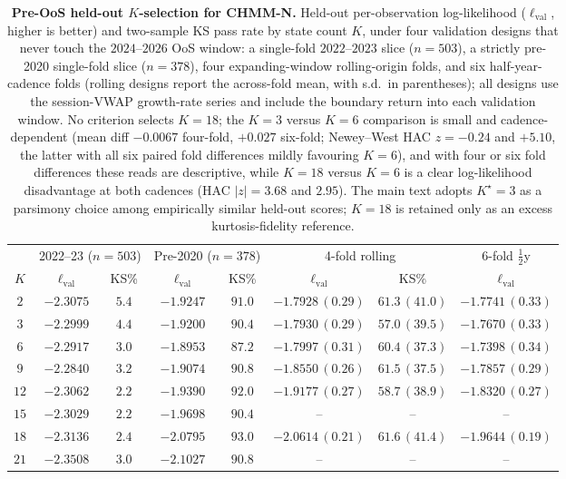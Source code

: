 \begin{table}[!htbp]
\centering
\footnotesize
\setlength{\tabcolsep}{4.5pt}
\renewcommand{\arraystretch}{0.95}
\caption{\textbf{Pre-OoS held-out $K$-selection for CHMM-N.} Held-out per-observation log-likelihood ($\ell_{\text{val}}$, higher is better) and two-sample KS pass rate by state count $K$, under four validation designs that never touch the $2024$--$2026$ OoS window: a single-fold $2022$--$2023$ slice ($n = 503$), a strictly pre-2020 single-fold slice ($n = 378$), four expanding-window rolling-origin folds, and six half-year-cadence folds (rolling designs report the across-fold mean, with s.d.\ in parentheses); all designs use the session-VWAP growth-rate series and include the boundary return into each validation window. No criterion selects $K = 18$; the $K = 3$ versus $K = 6$ comparison is small and cadence-dependent (mean diff $-0.0067$ four-fold, $+0.027$ six-fold; Newey--West HAC $z = -0.24$ and $+5.10$, the latter with all six paired fold differences mildly favouring $K = 6$), and with four or six fold differences these reads are descriptive, while $K = 18$ versus $K = 6$ is a clear log-likelihood disadvantage at both cadences (HAC $|z| = 3.68$ and $2.95$). The main text adopts $K^\star = 3$ as a parsimony choice among empirically similar held-out scores; $K = 18$ is retained only as an excess kurtosis-fidelity reference.}
\label{tab:k_selection_cv}
\begin{tabular}{c cc cc cc c}
\toprule
& \multicolumn{2}{c}{2022--23 ($n = 503$)} & \multicolumn{2}{c}{Pre-2020 ($n = 378$)} & \multicolumn{2}{c}{4-fold rolling} & 6-fold $\tfrac{1}{2}$y \\
\cmidrule(lr){2-3} \cmidrule(lr){4-5} \cmidrule(lr){6-7} \cmidrule(lr){8-8}
$K$ & $\ell_{\text{val}}$ & KS\% & $\ell_{\text{val}}$ & KS\% & $\ell_{\text{val}}$ & KS\% & $\ell_{\text{val}}$ \\
\midrule
$2$  & $-2.3075$ & $5.4$ & $-1.9247$ & $91.0$ & $-1.7928\,(0.29)$ & $61.3\,(41.0)$ & $-1.7741\,(0.33)$ \\
$3$  & $-2.2999$ & $4.4$ & $-1.9200$ & $90.4$ & $-1.7930\,(0.29)$ & $57.0\,(39.5)$ & $-1.7670\,(0.33)$ \\
$6$  & $-2.2917$ & $3.0$ & $-1.8953$ & $87.2$ & $-1.7997\,(0.31)$ & $60.4\,(37.3)$ & $-1.7398\,(0.34)$ \\
$9$  & $-2.2840$ & $3.2$ & $-1.9074$ & $90.8$ & $-1.8550\,(0.26)$ & $61.5\,(37.5)$ & $-1.7857\,(0.29)$ \\
$12$ & $-2.3062$ & $2.2$ & $-1.9390$ & $92.0$ & $-1.9177\,(0.27)$ & $58.7\,(38.9)$ & $-1.8320\,(0.27)$ \\
$15$ & $-2.3029$ & $2.2$ & $-1.9698$ & $90.4$ & --                & --             & --                \\
$18$ & $-2.3136$ & $2.4$ & $-2.0795$ & $93.0$ & $-2.0614\,(0.21)$ & $61.6\,(41.4)$ & $-1.9644\,(0.19)$ \\
$21$ & $-2.3508$ & $3.0$ & $-2.1027$ & $90.8$ & --                & --             & --                \\
\bottomrule
\end{tabular}
\end{table}

